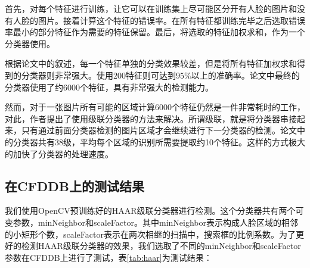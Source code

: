首先，对每个特征进行训练，让它可以在训练集上尽可能区分开有人脸的图片和没有人脸的图片。接着计算这个特征的错误率。在所有特征都训练完毕之后选取错误率最小的部分特征作为需要的特征保留。最后，将选取的特征加权求和，作为一个分类器使用。

根据论文\parencite{viola2004robust}中的叙述，每一个特征单独的分类效果较差，但是将所有特征加权求和得到的分类器则非常强大。使用200特征则可达到$95\%$以上的准确率。论文\parencite{viola2004robust}中最终的分类器使用了约6000个特征，具有非常强大的检测能力。

然而，对于一张图片所有可能的区域计算6000个特征仍然是一件非常耗时的工作，对此，作者提出了使用级联分类器的方法来解决。所谓级联，就是将分类器串接起来，只有通过前面分类器检测的图片区域才会继续进行下一分类器的检测。论文\parencite{viola2004robust}中的分类器共有38级，平均每个区域的识别所需要提取约10个特征。这样的方式极大的加快了分类器的处理速度。

\subsection{在CFDDB上的测试结果}

我们使用OpenCV预训练好的HAAR级联分类器进行检测。这个分类器共有两个可变参数，minNeighbor和scaleFactor。其中minNeighbor表示构成人脸区域的相邻的小矩形个数，scaleFactor表示在两次相继的扫描中，搜索框的比例系数。为了更好的检测HAAR级联分类器的效果，我们选取了不同的minNeighbor和scaleFactor参数在CFDDB上进行了测试，表\ref{tab:haar}为测试结果：

